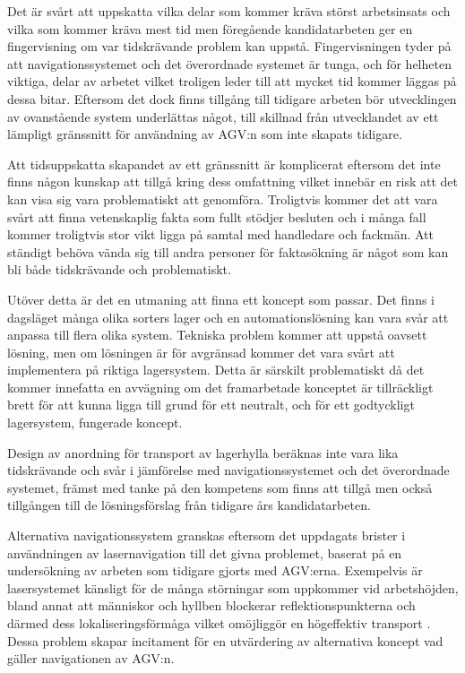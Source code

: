 \documentclass[a4paper,11pt]{article}
\begin{document}
Det är svårt att uppskatta vilka delar som kommer kräva störst arbetsinsats
och vilka som kommer kräva mest tid men föregående kandidatarbeten ger en
fingervisning om var tidskrävande problem kan uppstå. Fingervisningen tyder
på att navigationssystemet och det överordnade systemet är tunga, och för
helheten viktiga, delar av arbetet vilket troligen leder till att mycket
tid kommer läggas på dessa bitar. Eftersom det dock finns tillgång till
tidigare arbeten bör utvecklingen av ovanstående system underlättas något,
till skillnad från utvecklandet av ett lämpligt gränssnitt för användning
av AGV:n som inte skapats tidigare. 

Att tidsuppskatta skapandet av ett gränssnitt är komplicerat eftersom det
inte finns någon kunskap att tillgå kring dess omfattning vilket innebär en
risk att det kan visa sig vara problematiskt att genomföra. Troligtvis
kommer det att vara svårt att finna vetenskaplig fakta som fullt stödjer
besluten och i många fall kommer troligtvis stor vikt ligga på samtal med
handledare och fackmän. Att ständigt behöva vända sig till andra personer
för faktasökning är något som kan bli både tidskrävande och problematiskt.

Utöver detta är det en utmaning att finna ett koncept som passar. Det finns
i dagsläget många olika sorters lager och en automationslösning kan vara
svår att anpassa till flera olika system. Tekniska problem kommer att
uppstå oavsett lösning, men om lösningen är för avgränsad kommer det vara
svårt att implementera på riktiga lagersystem. Detta är särskilt
problematiskt då det kommer innefatta en avvägning om det framarbetade
konceptet är tillräckligt brett för att kunna ligga till grund för ett
neutralt, och för ett godtyckligt lagersystem, fungerade koncept.

Design av anordning för transport av lagerhylla beräknas inte vara lika
tidskrävande och svår i jämförelse med navigationssystemet och det
överordnade systemet, främst med tanke på den kompetens som finns att
tillgå men också tillgången till de lösningsförslag från tidigare års
kandidatarbeten.

Alternativa navigationssystem granskas eftersom det uppdagats brister i
användningen av lasernavigation till det givna problemet, baserat på en
undersökning av arbeten som tidigare gjorts med AGV:erna. Exempelvis är
lasersystemet känsligt för de många störningar som uppkommer vid
arbetshöjden, bland annat att människor och hyllben blockerar
reflektionspunkterna och därmed dess lokaliseringsförmåga vilket omöjliggör
en högeffektiv transport \cite{laser}. Dessa problem skapar incitament för
en utvärdering av alternativa koncept vad gäller navigationen av AGV:n.
\end{document}
